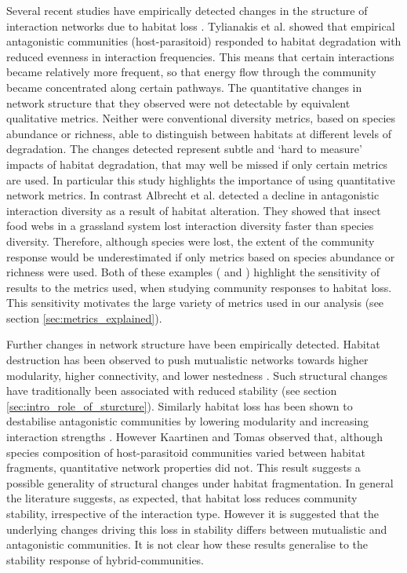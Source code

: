 Several recent studies have empirically detected changes in the structure of interaction networks due to habitat loss \cite{hagen2012biodiversity}. Tylianakis et al. \cite{tylianakis2007habitat} showed that empirical antagonistic communities (host-parasitoid) responded to habitat degradation with reduced evenness in interaction frequencies. This means that certain interactions became relatively more frequent, so that energy flow through the community became concentrated along certain pathways. The quantitative changes in network structure that they observed were not detectable by equivalent qualitative metrics. Neither were conventional diversity metrics, based on species abundance or richness, able to distinguish between habitats at different levels of degradation. The changes detected represent subtle and `hard to measure' impacts of habitat degradation, that may well be missed if only certain metrics are used. In particular this study highlights the importance of using quantitative network metrics. In contrast Albrecht et al. \cite{albrecht2007interaction} detected a decline in antagonistic interaction diversity as a result of habitat alteration. They showed that insect food webs in a grassland system lost interaction diversity faster than species diversity. Therefore, although species were lost, the extent of the community response would be underestimated if only metrics based on species abundance or richness were used. Both of these examples (\cite{tylianakis2007habitat} and \cite{albrecht2007interaction}) highlight the sensitivity of results to the metrics used, when studying community responses to habitat loss. This sensitivity motivates the large variety of metrics used in our analysis (see section \ref{sec:metrics_explained}).

Further changes in network structure have been empirically detected. Habitat destruction has been observed to push mutualistic networks towards higher modularity, higher connectivity, and lower nestedness \cite{spiesman2013habitat}. Such structural changes have traditionally been associated with reduced stability (see section \ref{sec:intro_role_of_sturcture}). Similarly habitat loss has been shown to destabilise antagonistic communities by lowering modularity and increasing interaction strengths \cite{hagen2012biodiversity}. However Kaartinen and Tomas \cite{kaartinen2011shrinking} observed that, although species composition of host-parasitoid communities varied between habitat fragments, quantitative network properties did not. This result suggests a possible generality of structural changes under habitat fragmentation. In general the literature suggests, as expected, that habitat loss reduces community stability, irrespective of the interaction type. However it is suggested that the underlying changes driving this loss in stability differs between mutualistic and antagonistic communities. It is not clear how these results generalise to the stability response of hybrid-communities. 

